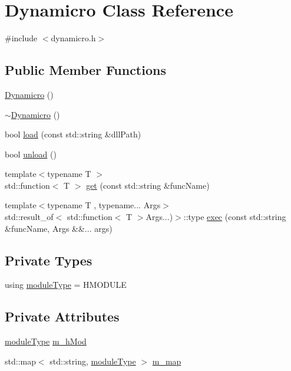 \hypertarget{class_dynamicro}{}\section{Dynamicro Class Reference}
\label{class_dynamicro}


{\ttfamily \#include $<$dynamicro.\+h$>$}

\subsection*{Public Member Functions}
\begin{DoxyCompactItemize}
\item 
\mbox{\hyperlink{class_dynamicro_adc18806affe30aa2de02503621956a76}{Dynamicro}} ()
\item 
\mbox{\hyperlink{class_dynamicro_aaf074dfe2316bbee5f46db362792368b}{$\sim$\+Dynamicro}} ()
\item 
bool \mbox{\hyperlink{class_dynamicro_a137bec04fec010015a1ee72eba03b77e}{load}} (const std\+::string \&dll\+Path)
\item 
bool \mbox{\hyperlink{class_dynamicro_a80f1cc3d7f5a22c7ef0824ac86cd36c1}{unload}} ()
\item 
{\footnotesize template$<$typename T $>$ }\\std\+::function$<$ T $>$ \mbox{\hyperlink{class_dynamicro_a40444463dc44ec4c54af99a45b9a7efe}{get}} (const std\+::string \&func\+Name)
\item 
{\footnotesize template$<$typename T , typename... Args$>$ }\\std\+::result\+\_\+of$<$ std\+::function$<$ T $>$Args...)$>$\+::type \mbox{\hyperlink{class_dynamicro_a6aa58c6eaee11117ee74462ad4c3325e}{exec}} (const std\+::string \&func\+Name, Args \&\&... args)
\end{DoxyCompactItemize}
\subsection*{Private Types}
\begin{DoxyCompactItemize}
\item 
using \mbox{\hyperlink{class_dynamicro_a8476681e7880be183a320960f3373a47}{module\+Type}} = H\+M\+O\+D\+U\+LE
\end{DoxyCompactItemize}
\subsection*{Private Attributes}
\begin{DoxyCompactItemize}
\item 
\mbox{\hyperlink{class_dynamicro_a8476681e7880be183a320960f3373a47}{module\+Type}} \mbox{\hyperlink{class_dynamicro_aa4012590c2140283b7d74dbc47f6ba72}{m\+\_\+h\+Mod}}
\item 
std\+::map$<$ std\+::string, \mbox{\hyperlink{class_dynamicro_a8476681e7880be183a320960f3373a47}{module\+Type}} $>$ \mbox{\hyperlink{class_dynamicro_ad90c1bb73dfca18828f8a874ecaab102}{m\+\_\+map}}
\end{DoxyCompactItemize}


